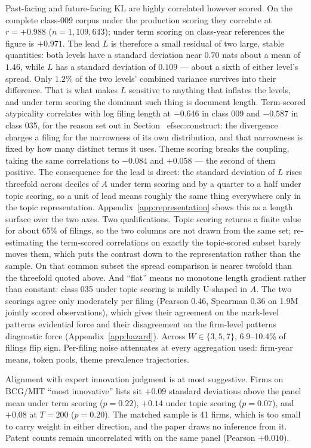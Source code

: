 Past-facing and future-facing KL are highly correlated however scored. On the
complete class-009 corpus under the production scoring they correlate at
$r = +0.988$ ($n = 1{,}109{,}643$); under term scoring on class-year
references the figure is $+0.971$. The lead $L$ is therefore a small residual
of two large, stable quantities: both levels have a standard deviation near
$0.70$ nats about a mean of $1.46$, while $L$ has a standard deviation of
$0.109$ --- about a sixth of either level's spread. Only $1.2\%$ of the two
levels' combined variance survives into their difference. That is what makes $L$ sensitive to
anything that inflates the levels, and under term scoring the dominant
such thing is document length. Term-scored
atypicality correlates with log filing length at $-0.646$ in class 009 and
$-0.587$ in class 035, for the reason set out in Section~
ef{sec:construct}:
the divergence charges a filing for the narrowness of its own distribution, and
that narrowness is fixed by how many distinct terms it uses. Theme scoring
breaks the coupling, taking the same correlations to $-0.084$ and $+0.058$ ---
the second of them positive. The consequence for the lead is direct: the standard deviation
of $L$ rises threefold across deciles of $A$ under term scoring and by a
quarter to a half under topic scoring, so a unit of lead means roughly the
same thing everywhere only in the topic representation.
Appendix~\ref{app:representation} shows this as a length surface over the
two axes. Two qualifications. Topic scoring returns a finite value for about 65\% of
filings, so the two columns are not drawn from the same set; re-estimating the
term-scored correlations on exactly the topic-scored subset barely moves them,
which puts the contrast down to the representation rather than the sample. On
that common subset the spread comparison is nearer twofold than the threefold
quoted above. And ``flat'' means no
monotone length gradient rather than constant: class 035 under topic
scoring is mildly U-shaped in $A$. The two scorings agree only
moderately per filing (Pearson 0.46, Spearman 0.36 on 1.9M jointly
scored observations), which gives their agreement on the mark-level
patterns evidential force and their disagreement on the firm-level
patterns diagnostic force (Appendix~\ref{app:hazard}). Across
$W \in \{3, 5, 7\}$, 6.9--10.4\% of filings flip sign. Per-filing noise
attenuates at every aggregation used: firm-year means, token pools,
theme prevalence trajectories.

Alignment with expert innovation judgment is at most suggestive. Firms on
BCG/MIT ``most innovative'' lists sit $+0.09$ standard deviations above the panel mean
under term scoring ($p = 0.22$), $+0.14$ under topic scoring
($p = 0.07$), and $+0.08$ at $T = 200$ ($p = 0.20$). The matched
sample is 41 firms, which is too small to carry weight in either
direction, and the paper draws no inference from it. Patent counts remain
uncorrelated with \dkl{} on the same panel (Pearson $+0.010$).


